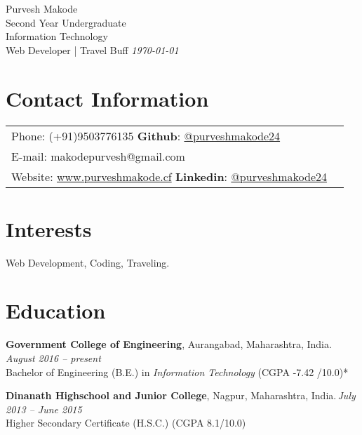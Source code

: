 \documentclass[margin,line]{res}
\begin{document}
{\Huge \ttfamily Purvesh Makode} \\
{\small Second Year Undergraduate}\\
{\small Information Technology}\\
{\small Web Developer | Travel Buff} \hspace{11cm} {\em \today}
\vspace{0.03in}
\begin{resume}
\section{\sc Contact Information}



\vspace{.08in}

\begin{tabular} {@{}p{10in}p{1in}}  
             {Phone:}  (+91)9503776135  \hspace{6cm} {\bf Github}: \href{https://github.com/PurveshMakode24}{@purveshmakode24}\\ 
		{E-mail:}  makodepurvesh@gmail.com\\
		 {Website:} \url{www.purveshmakode.cf} \hspace{4.73cm} {\bf Linkedin}: \href{https://www.linkedin.com/in/purveshmakode24/}{@purveshmakode24}
\end{tabular}


\section{\sc Interests}

Web Development, Coding, Traveling.
\vspace{0.3cm}

\section{\sc Education}
{\bf Government College of Engineering}, Aurangabad, Maharashtra, India.\, \hfill  {\em August 2016 -- present} \\
Bachelor of Engineering (B.E.) in {\em Information Technology } \hfill(CGPA -7.42 /10.0)*

{\bf Dinanath Highschool and Junior College}, Nagpur, Maharashtra, India.\,\hfill {\em July 2013 -- June 2015}\\
Higher Secondary Certificate (H.S.C.) \hfill(CGPA 8.1/10.0)
 \vspace{0.4cm}
\iffalse

\end{resume}
\end{document}
